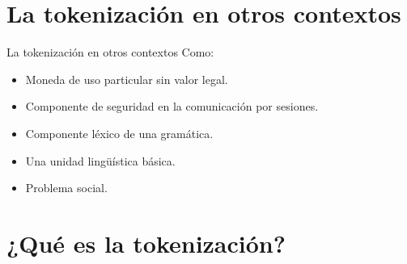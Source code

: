 \documentclass{beamer}
\begin{document}
  \section{La tokenización en otros contextos}

  \begin{frame}{La tokenización en otros contextos}
    Como:
    \begin{itemize}
      \item Moneda de uso particular sin valor legal.
      \item Componente de seguridad en la comunicación por sesiones.
      \item Componente léxico de una gramática.
      \item Una unidad lingüística básica.
      \item Problema social.
    \end{itemize}
  \end{frame}

  \section{¿Qué es la tokenización?}
\end{document}
